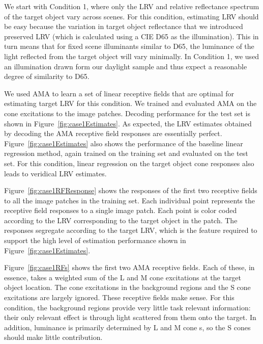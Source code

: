 \documentclass{jov}
\begin{document}
We start with Condition 1, where only the LRV and relative reflectance spectrum of the target object vary across scenes.
For this condition, estimating LRV should be easy because the variation in target object reflectance that we introduced
preserved LRV (which is calculated using a CIE D65 as the illumination).
This in turn means that for fixed scene illuminants similar to D65, the luminance of the light reflected from the target object will vary minimally.
In Condition 1, we used an illumination drawn form our daylight sample and thus expect a reasonable degree of similarity to D65.

We used AMA to learn a set of linear receptive fields that are optimal for estimating target LRV for this condition.
We trained and evaluated AMA on the cone excitations to the image patches.
Decoding performance for the test set is shown in Figure~\ref{fig:case1Estimates}.
As expected, the LRV estimates obtained by decoding the AMA receptive field responses are essentially perfect.
Figure~\ref{fig:case1Estimates} also shows the performance of the baseline linear regression method, again trained
on the training set and evaluated on the test set.
For this condition, linear regression on the target object cone responses also leads to veridical LRV estimates.

Figure~\ref{fig:case1RFResponse} shows the responses of the first two receptive fields to all the image patches in the training set.
Each individual point represents the receptive field responses to a single image patch.
Each point is color coded according to the LRV corresponding to the target object in the patch.
The responses segregate according to the target LRV, which is the feature required to support the high level 
of estimation performance shown in Figure~\ref{fig:case1Estimates}.

Figure~\ref{fig:case1RFs} shows the first two AMA receptive fields.
Each of these, in essence, takes a weighted sum of the L and M cone excitations at the target object location.
The cone excitations in the background regions and the S cone excitations are largely ignored.
These receptive fields make sense.
For this condition, the background regions provide very little task relevant information: their only relevant effect is
through light scattered from them onto the target.
In addition, luminance is primarily determined by L and M cone s, so the S cones should make little
contribution.
\end{document}
